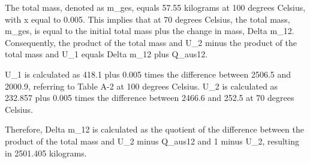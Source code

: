 The total mass, denoted as m_{ges}, equals 57.55 kilograms at 100 degrees Celsius, with x equal to 0.005. This implies that at 70 degrees Celsius, the total mass, m_{ges}, is equal to the initial total mass plus the change in mass, Delta m_{12}. Consequently, the product of the total mass and U_2 minus the product of the total mass and U_1 equals Delta m_{12} plus Q_{aus12}. 

U_1 is calculated as 418.1 plus 0.005 times the difference between 2506.5 and 2000.9, referring to Table A-2 at 100 degrees Celsius. U_2 is calculated as 232.857 plus 0.005 times the difference between 2466.6 and 252.5 at 70 degrees Celsius. 

Therefore, Delta m_{12} is calculated as the quotient of the difference between the product of the total mass and U_2 minus Q_{aus12} and 1 minus U_2, resulting in 2501.405 kilograms.